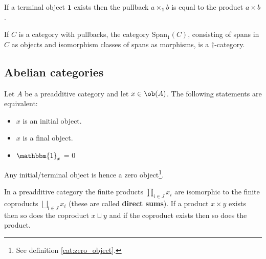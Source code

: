 	\begin{property}
		If a terminal object $\mathbf{1}$ exists then the pullback $a\times_{\mathbf{1}}b$ is equal to the product $a\times b$.
	\end{property}
	
	\begin{property}
		If $C$ is a category with pullbacks, the category Span$_1(C)$, consisting of spans in $C$ as objects and isomorphism classes of spans as morphisms, is a $\dag$-category.
	\end{property}

\subsection{Abelian categories}

	
	\begin{property}
		Let $A$ be a preadditive category and let $x\in\ob(A)$. The following statements are equivalent:
		\begin{itemize}
			\item $x$ is an initial object.
			\item $x$ is a final object.
			\item $\mathbbm{1}_x$ = 0
		\end{itemize}
		Any initial/terminal object is hence a zero object\footnote{See definition \ref{cat:zero_object}.}.
	\end{property}
	\begin{property}
		In a preadditive category the finite products $\prod_{i\in J}x_i$ are isomorphic to the finite coproducts $\bigsqcup_{i\in J} x_i$ (these are called \textbf{direct sums}). If a product $x\times y$ exists then so does the coproduct $x\sqcup y$ and if the coproduct exists then so does the product.
	\end{property}
	
